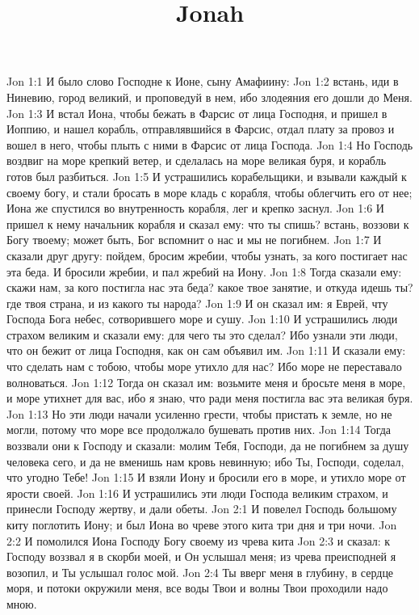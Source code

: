 

\title{Jonah}

Jon 1:1  И было слово Господне к Ионе, сыну Амафиину:
Jon 1:2  встань, иди в Ниневию, город великий, и проповедуй в нем, ибо злодеяния его дошли до Меня.
Jon 1:3  И встал Иона, чтобы бежать в Фарсис от лица Господня, и пришел в Иоппию, и нашел корабль, отправлявшийся в Фарсис, отдал плату за провоз и вошел в него, чтобы плыть с ними в Фарсис от лица Господа.
Jon 1:4  Но Господь воздвиг на море крепкий ветер, и сделалась на море великая буря, и корабль готов был разбиться.
Jon 1:5  И устрашились корабельщики, и взывали каждый к своему богу, и стали бросать в море кладь с корабля, чтобы облегчить его от нее; Иона же спустился во внутренность корабля, лег и крепко заснул.
Jon 1:6  И пришел к нему начальник корабля и сказал ему: что ты спишь? встань, воззови к Богу твоему; может быть, Бог вспомнит о нас и мы не погибнем.
Jon 1:7  И сказали друг другу: пойдем, бросим жребии, чтобы узнать, за кого постигает нас эта беда. И бросили жребии, и пал жребий на Иону.
Jon 1:8  Тогда сказали ему: скажи нам, за кого постигла нас эта беда? какое твое занятие, и откуда идешь ты? где твоя страна, и из какого ты народа?
Jon 1:9  И он сказал им: я Еврей, чту Господа Бога небес, сотворившего море и сушу.
Jon 1:10  И устрашились люди страхом великим и сказали ему: для чего ты это сделал? Ибо узнали эти люди, что он бежит от лица Господня, как он сам объявил им.
Jon 1:11  И сказали ему: что сделать нам с тобою, чтобы море утихло для нас? Ибо море не переставало волноваться.
Jon 1:12  Тогда он сказал им: возьмите меня и бросьте меня в море, и море утихнет для вас, ибо я знаю, что ради меня постигла вас эта великая буря.
Jon 1:13  Но эти люди начали усиленно грести, чтобы пристать к земле, но не могли, потому что море все продолжало бушевать против них.
Jon 1:14  Тогда воззвали они к Господу и сказали: молим Тебя, Господи, да не погибнем за душу человека сего, и да не вменишь нам кровь невинную; ибо Ты, Господи, соделал, что угодно Тебе!
Jon 1:15  И взяли Иону и бросили его в море, и утихло море от ярости своей.
Jon 1:16  И устрашились эти люди Господа великим страхом, и принесли Господу жертву, и дали обеты.
Jon 2:1  И повелел Господь большому киту поглотить Иону; и был Иона во чреве этого кита три дня и три ночи.
Jon 2:2  И помолился Иона Господу Богу своему из чрева кита
Jon 2:3  и сказал: к Господу воззвал я в скорби моей, и Он услышал меня; из чрева преисподней я возопил, и Ты услышал голос мой.
Jon 2:4  Ты вверг меня в глубину, в сердце моря, и потоки окружили меня, все воды Твои и волны Твои проходили надо мною.
